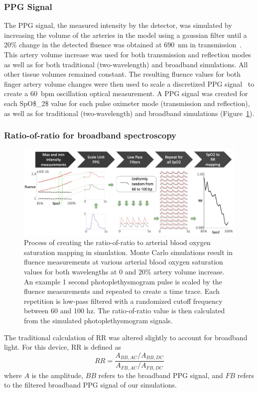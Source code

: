 \subsubsection{PPG Signal}
The \ac{PPG} signal, the measured intensity by the detector, was simulated by increasing the volume of the arteries in the model using a gaussian filter until a 20\% change in the detected fluence was obtained at 690~nm in transmission~\cite{Hertzman1938}. This artery volume increase was used for both transmission and reflection modes as well as for both traditional (two-wavelength) and broadband simulations. All other tissue volumes remained constant. The resulting fluence values for both finger artery volume changes were then used to scale a discretized \ac{PPG} signal~\cite{Elgendi2012} to create a 60~bpm oscillation optical measurement. A \ac{PPG} signal was created for each \ac{SpO$_2$} value for each pulse oximeter mode (transmission and reflection), as well as for traditional (two-wavelength) and broadband simulations (Figure~\ref{fig:D3process}). 
        
\subsubsection{Ratio-of-ratio for broadband spectroscopy}
\begin{figure}
    \begin{center}
    \includegraphics[width=\textwidth]{fig/moxi/D3process.pdf}
    \end{center}
    \caption{Process of creating the ratio-of-ratio to arterial blood oxygen saturation mapping in simulation. Monte Carlo simulations result in fluence measurements at various arterial blood oxygen saturation values for both wavelengths at 0 and 20\% artery volume increase. An example 1 second photoplethysmogram pulse is scaled by the fluence measurements and repeated to create a time trace. Each repetition is low-pass filtered with a randomized cutoff frequency between 60 and 100 hz. The ratio-of-ratio value is then calculated from the simulated photoplethysmogram signals.} 
    \label{fig:D3process}
\end{figure} 
The traditional calculation of \ac{RR} was altered slightly to account for broadband light. For this device, \ac{RR} is defined as 
\begin{equation} \label{eq:RRbroadband}
    RR = \frac{ A_{BB,AC}/A_{BB,DC} }{ A_{FB,AC}/A_{FB,DC} }
\end{equation}
where $A$ is the amplitude, $BB$ refers to the broadband \ac{PPG} signal, and $FB$ refers to the filtered broadband \ac{PPG} signal of our simulations. 
        
